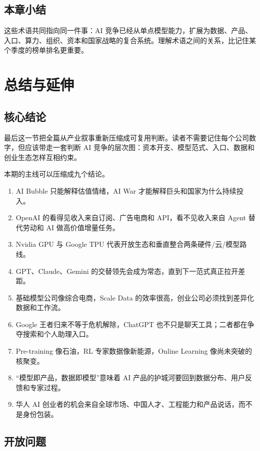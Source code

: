 \documentclass[a4paper]{article}
\begin{document}
\subsection{本章小结}

这些术语共同指向同一件事：AI 竞争已经从单点模型能力，扩展为数据、产品、入口、算力、组织、资本和国家战略的复合系统。理解术语之间的关系，比记住某个季度的榜单排名更重要。

\section{总结与延伸}

\subsection{核心结论}

最后这一节把全篇从产业叙事重新压缩成可复用判断。读者不需要记住每个公司数字，但应该带走一套判断 AI 竞争的层次图：资本开支、模型范式、入口、数据和创业生态怎样互相约束。

本期的主线可以压缩成九个结论。

\begin{enumerate}
\item AI Bubble 只能解释估值情绪，AI War 才能解释巨头和国家为什么持续投入。
\item OpenAI 的看得见收入来自订阅、广告电商和 API，看不见收入来自 Agent 替代劳动和 AI 做高价值增量任务。
\item Nvidia GPU 与 Google TPU 代表开放生态和垂直整合两条硬件/云/模型路线。
\item GPT、Claude、Gemini 的交替领先会成为常态，直到下一范式真正拉开差距。
\item 基础模型公司像综合电商，Scale Data 的效率很高，创业公司必须找到差异化数据和工作流。
\item Google 王者归来不等于危机解除，ChatGPT 也不只是聊天工具；二者都在争夺搜索和个人助理入口。
\item Pre-training 像石油，RL 专家数据像新能源，Online Learning 像尚未突破的核聚变。
\item “模型即产品，数据即模型”意味着 AI 产品的护城河要回到数据分布、用户反馈和专家过程。
\item 华人 AI 创业者的机会来自全球市场、中国人才、工程能力和产品说话，而不是身份包装。
\end{enumerate}

\subsection{开放问题}
\end{document}
